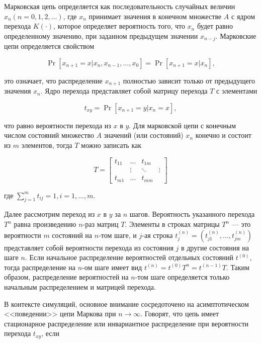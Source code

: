 Марковская цепь определяется как последовательность случайных величин $x_n (n=0,1,2,\ldots )$, где $x_n$ принимает значения в конечном множестве $A$ с ядром перехода $K(\cdot)$, которое определяет вероятность того, что $x_n$ будет равно определенному значению, при заданном предыдущем значении $x_{n-j}$. Марковские цепи определяется свойством

\begin{equation}
\Pr[x_{n+1}=x|x_n,x_{n-1},\ldots ,x_0]=\Pr[x_{n+1}=x|x_n],
\end{equation} 

это означает, что распределение $x_{n+1}$ полностью зависит только от предыдущего значения $x_n$. Ядро перехода представляет собой матрицу перехода $T$ с элементами

\begin{equation}
t_{xy}=\Pr[x_{n+1}=y|x_n=x],
\end{equation}

что равно вероятности перехода из $x$ в $y$. Для марковской цепи с конечным числом состояний множество $A$ значений (или состояний)  $x_n$ конечно и состоит из $m$ элементов, тогда $T$ можно записать как



\[ T=
\begin{bmatrix}
t_{11} & \dots & t_{1m} \\
& \vdots & \ddots & \vdots\\
t_{m1} & \dots & t_{mm}
\end{bmatrix}
\]

где $\sum^{m}_{j=1}t_{ij}=1, i=1,\ldots ,m$.

Далее рассмотрим переход из $x$ в $y$ за $n$ шагов. Вероятность указанного перехода $T^n$ равна произведению $n$-раз матриц $T$. Элементы в строках матрицы $T^n$ --- это вероятности   $m$ состояний на $n$-том шаге, и  $j$-ая строка $t^{(n)}_j=(t^{(n)}_{j1},\ldots ,t^{(n)}_{jm})$ представляет собой вероятности перехода из состояния $j$ в другие состояния на шаге $n$. Если начальное распределение вероятностей отдельных состояний $t^{(0)}$, тогда распределение на $n$-ом шаге имеет вид $t^{(n)}=t^{(0)}T^n=t^{(n-1)}T$. Таким образом, распределение вероятностей на $n$-том шаге определяется только начальным распределением и матрицей перехода.

В контексте симуляций, основное внимание сосредоточено на асимптотическом <<поведении>> цепи Маркова при $n{\rightarrow}\infty$. Говорят, что цепь имеет стационарное распределение или инвариантное распределение при вероятности перехода $t_{xy}$, если 

